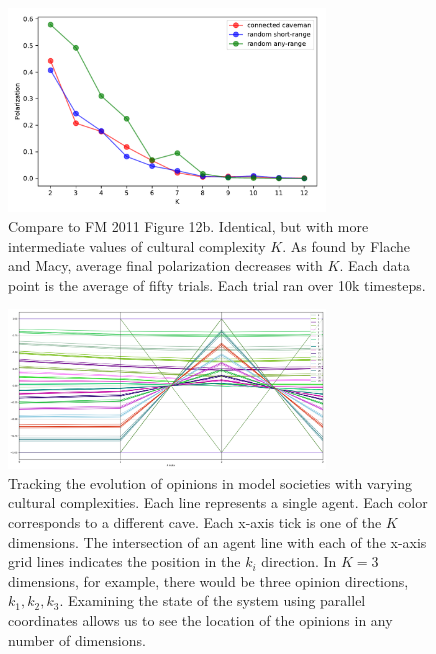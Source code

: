 \documentclass[11pt,letterpaper]{article}
\begin{document}
\begin{figure}
  \centering
      \includegraphics[width=0.75\textwidth]{Figures/finegrained_p_vs_K.pdf}
  \caption{
    Compare to FM 2011 Figure 12b. Identical, but with more intermediate
    values of cultural complexity $K$. As found by Flache and Macy, 
    average final polarization decreases with $K$. Each
    data point is the average of fifty trials. Each trial ran over 
    10k timesteps.
  }
  \label{fig:k_finegrained}
\end{figure}

\begin{figure}
  \centering
  \includegraphics[width=0.75\textwidth]{parallel_coords_k=4.png}
  \caption{Tracking the evolution of opinions in model societies with varying
    cultural complexities. Each line represents a single agent. Each color
    corresponds to a different cave. 
    Each x-axis tick is one of the $K$ dimensions.
    The intersection of an agent line with each of the x-axis grid lines indicates
    the position in the $k_i$ direction. In $K=3$ dimensions, for example, 
    there would be three opinion directions, $k_1, k_2, k_3$.
    Examining the state of the system using parallel 
    coordinates allows us to see the location of the opinions in any number
    of dimensions.}
  \label{fig:parallel-coords}
\end{figure}
\end{document}
